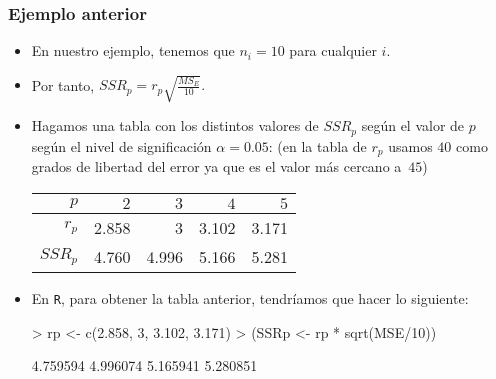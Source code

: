 \begin{frame}[fragile]
\frametitle{Ejemplo anterior}
\begin{itemize}
\item<2-> En nuestro ejemplo, tenemos que $n_i =10$ para cualquier $i$.
\item<3-> Por tanto, $SSR_p = r_p \sqrt{\frac{MS_E}{10}}.$
\item<4-> Hagamos una tabla con los distintos valores de $SSR_p$ según el valor de $p$ según el nivel de significación $\alpha =0.05$: (en la tabla
de $r_p$ usamos $40$ como grados de libertad del error ya que es el valor más cercano a~$45$)
\begin{center}
\begin{tabular}{|r|r|r|r|r|}
\hline
$p$&$2$&$3$&$4$&$5$\\\hline
$r_p$&2.858&3&3.102&3.171\\\hline
$SSR_p$&4.760&4.996&5.166&5.281\\\hline
\end{tabular}
\end{center}
\item<5-> En {\tt R}, para obtener la tabla anterior, tendríamos que hacer lo siguiente:

\begin{Schunk}
\begin{Sinput}
> rp <- c(2.858, 3, 3.102, 3.171)
> (SSRp <- rp * sqrt(MSE/10))
\end{Sinput}
\begin{Soutput}
[1] 4.759594 4.996074 5.165941 5.280851
\end{Soutput}
\end{Schunk}

\end{itemize}
\end{frame}

